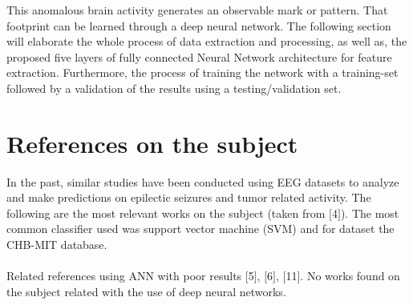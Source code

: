 \documentclass{llncs}       %
\begin{document}
This anomalous brain activity generates an observable mark or pattern. That footprint can be learned through a deep neural network. The following section will elaborate the whole process of data extraction and processing, as well as, the proposed five layers of fully connected Neural Network architecture for feature extraction. Furthermore, the process of training the network with a training-set followed by a validation of the results using a testing/validation set. 

\paragraph{}\paragraph{}

\section{References on the subject}
\label{sec:1}

In the past, similar studies have been conducted using EEG datasets to analyze and make predictions on epilectic seizures and tumor related activity. 
The following are the most relevant works on the subject (taken from $[$4$]$). The most common classifier 
used was support vector machine (SVM) and for dataset the CHB-MIT 
database. 


\paragraph{}
Related references using ANN with poor results $[$5$]$, $[$6$]$, 
$[$11$]$. No works found on the subject related with the use of deep neural networks.

\paragraph{}
\paragraph{}
\paragraph{}



\paragraph{}
\end{document}
